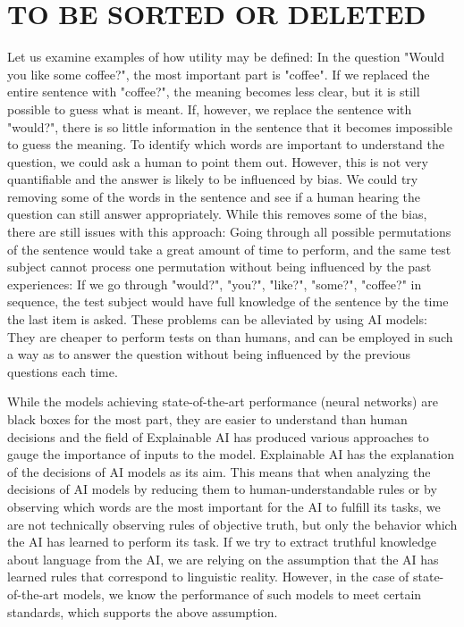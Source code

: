 
\section{TO BE SORTED OR DELETED}
Let us examine examples of how utility may be defined:
In the question "Would you like some coffee?", the most important part is "coffee".
If we replaced the entire sentence with "coffee?", the meaning becomes less clear, but it is still possible to guess what is meant.
If, however, we replace the sentence with "would?", there is so little information in the sentence that it becomes impossible to guess the meaning.
To identify which words are important to understand the question, we could ask a human to point them out.
However, this is not very quantifiable and the answer is likely to be influenced by bias.
We could try removing some of the words in the sentence and see if a human hearing the question can still answer appropriately.
While this removes some of the bias, there are still issues with this approach:
Going through all possible permutations of the sentence would take a great amount of time to perform, and the same test subject cannot process one permutation without being influenced by the past experiences:
If we go through "would?", "you?", "like?", "some?", "coffee?" in sequence, the test subject would have full knowledge of the sentence by the time the last item is asked.
These problems can be alleviated by using AI models: They are cheaper to perform tests on than humans, and can be employed in such a way as to answer the question without being influenced by the previous questions each time.



While the models achieving state-of-the-art performance (neural networks) are black boxes for the most part, they are easier to understand than human decisions and the field of Explainable AI has produced various approaches to gauge the importance of inputs to the model.
Explainable AI has the explanation of the decisions of AI models as its aim.
This means that when analyzing the decisions of AI models by reducing them to human-understandable rules or by observing which words are the most important for the AI to fulfill its tasks, we are not technically observing rules of objective truth, but only the behavior which the AI has learned to perform its task.
If we try to extract truthful knowledge about language from the AI, we are relying on the assumption that the AI has learned rules that correspond to linguistic reality.
However, in the case of state-of-the-art models, we know the performance of such models to meet certain standards, which supports the above assumption.





